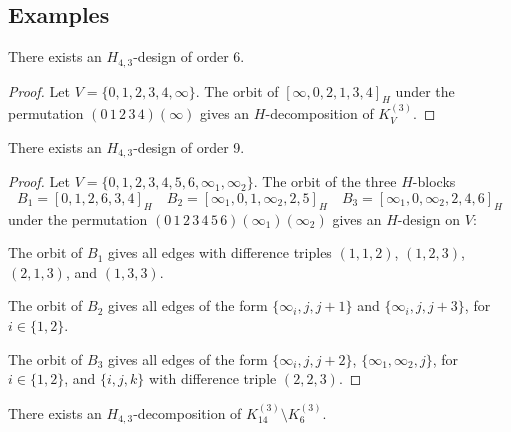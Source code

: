 \begin{subappendices}

\section{Examples}


\begin{example} \label{eg:H_43-6}
There exists an $H_{4,3}$-design of order 6.
\end{example}

\begin{proof}
Let $V = \{0,1,2,3,4,\infty\}$. The orbit of $[\infty, 0, 2, 1, 3, 4]_H$ under
the permutation $(0\, 1\, 2\, 3\, 4)(\infty)$ gives an $H$-decomposition of
$K_V^{(3)}$.
\end{proof}



\begin{example} \label{eg:H_43-9}
There exists an $H_{4,3}$-design of order 9.
\end{example}

\begin{proof}
Let $V = \{0,1,2,3,4,5,6,\infty_1,\infty_2\}$. The orbit of the three $H$-blocks
\[
    B_1 = [0,1,2,6,3,4]_H \quad
    B_2 = [\infty_1, 0, 1, \infty_2, 2, 5]_H \quad
    B_3 = [\infty_1, 0, \infty_2, 2, 4, 6]_H
\]
under the permutation $(0\, 1\, 2\, 3\, 4\, 5\, 6)(\infty_1)(\infty_2)$ gives an $H$-design on $V$:

The orbit of $B_1$ gives all edges with difference triples $(1, 1, 2)$, $(1, 2, 3)$, $(2, 1, 3)$, and $(1, 3, 3)$.

The orbit of $B_2$ gives all edges of the form $\{\infty_i, j, j+1\}$ and $\{\infty_i, j, j+3\}$, for $i \in \{1, 2\}$.

The orbit of $B_3$ gives all edges of the form $\{\infty_i, j, j+2\}$, $\{\infty_1, \infty_2, j\}$, for $i \in \{1, 2\}$, and $\{i, j, k\}$ with difference triple $(2, 2, 3)$.
\end{proof}



\begin{example} \label{eg:H_43-k14-k6}
There exists an $H_{4,3}$-decomposition of $K_{14}^{(3)} \setminus K_{6}^{(3)}$.
\end{example}


\end{subappendices}
